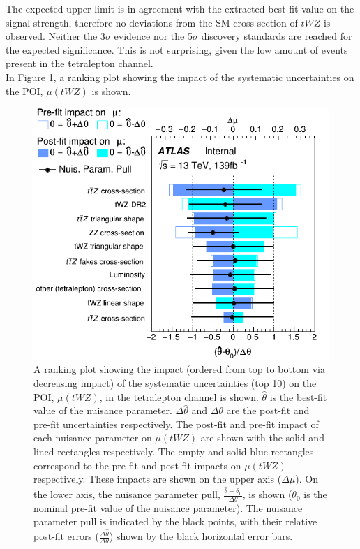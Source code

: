 The expected upper limit is in agreement with the extracted best-fit value on the signal strength, therefore no deviations from the SM cross section of $tWZ$ is observed. Neither the 3$\sigma$ evidence nor the 5$\sigma$ discovery standards are reached for the expected significance. This is not surprising, given the low amount of events present in the tetralepton channel.\\

In Figure \ref{fig:4lep-PostFit-nuisance-ranking}, a ranking plot showing the impact of the systematic uncertainties on the POI, $\mu (tWZ)$ is shown.

\begin{figure}[h!]
\centering
    \includegraphics[width=.65\textwidth]{figures/PostFitPlots/RankingSysts_SigXsecOverSM_systs}
    \caption{A ranking plot showing the impact (ordered from top to bottom via decreasing impact) of the systematic uncertainties (top 10) on the POI, $\mu (tWZ)$, in the tetralepton channel is shown. $\hat{\theta}$ is the best-fit value of the nuisance parameter. $\Delta \hat{\theta}$ and $\Delta\theta$ are the post-fit and pre-fit uncertainties respectively. The post-fit and pre-fit impact of each nuisance parameter on $\mu (tWZ)$ are shown with the solid and lined rectangles respectively. The empty and solid blue rectangles correspond to the pre-fit and post-fit impacts on $\mu (tWZ)$ respectively. These impacts are shown on the upper axis ($\Delta \mu$). On the lower axis, the nuisance parameter pull, $\frac{\hat{\theta} - \theta_{0}}{\Delta{\theta}}$, is shown ($\theta_{0}$ is the nominal pre-fit value of the nuisance parameter). The nuisance parameter pull is indicated by the black points, with their relative post-fit errors ($\frac{\Delta \hat{\theta}}{\Delta \theta}$) shown by the black horizontal error bars.}
  \label{fig:4lep-PostFit-nuisance-ranking}
\end{figure}

